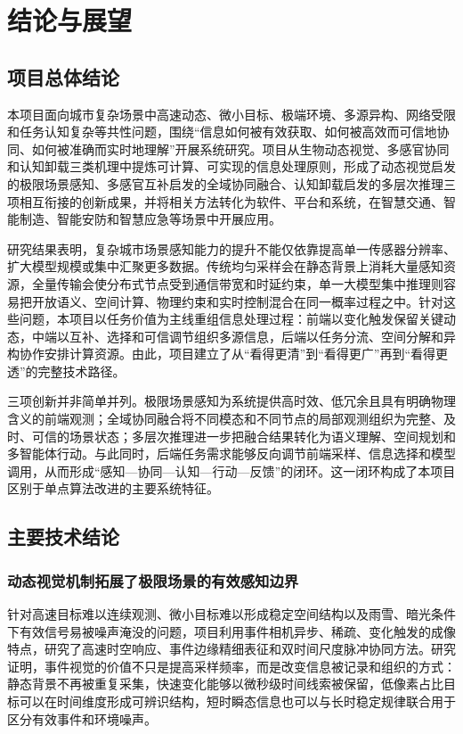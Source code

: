 \section{结论与展望}

\subsection{项目总体结论}

本项目面向城市复杂场景中高速动态、微小目标、极端环境、多源异构、网络受限和任务认知复杂等共性问题，围绕“信息如何被有效获取、如何被高效而可信地协同、如何被准确而实时地理解”开展系统研究。项目从生物动态视觉、多感官协同和认知卸载三类机理中提炼可计算、可实现的信息处理原则，形成了动态视觉启发的极限场景感知、多感官互补启发的全域协同融合、认知卸载启发的多层次推理三项相互衔接的创新成果，并将相关方法转化为软件、平台和系统，在智慧交通、智能制造、智能安防和智慧应急等场景中开展应用。

研究结果表明，复杂城市场景感知能力的提升不能仅依靠提高单一传感器分辨率、扩大模型规模或集中汇聚更多数据。传统均匀采样会在静态背景上消耗大量感知资源，全量传输会使分布式节点受到通信带宽和时延约束，单一大模型集中推理则容易把开放语义、空间计算、物理约束和实时控制混合在同一概率过程之中。针对这些问题，本项目以任务价值为主线重组信息处理过程：前端以变化触发保留关键动态，中端以互补、选择和可信调节组织多源信息，后端以任务分流、空间分解和异构协作安排计算资源。由此，项目建立了从“看得更清”到“看得更广”再到“看得更透”的完整技术路径。

三项创新并非简单并列。极限场景感知为系统提供高时效、低冗余且具有明确物理含义的前端观测；全域协同融合将不同模态和不同节点的局部观测组织为完整、及时、可信的场景状态；多层次推理进一步把融合结果转化为语义理解、空间规划和多智能体行动。与此同时，后端任务需求能够反向调节前端采样、信息选择和模型调用，从而形成“感知---协同---认知---行动---反馈”的闭环。这一闭环构成了本项目区别于单点算法改进的主要系统特征。

\subsection{主要技术结论}

\subsubsection{动态视觉机制拓展了极限场景的有效感知边界}

针对高速目标难以连续观测、微小目标难以形成稳定空间结构以及雨雪、暗光条件下有效信号易被噪声淹没的问题，项目利用事件相机异步、稀疏、变化触发的成像特点，研究了高速时空响应、事件边缘精细表征和双时间尺度脉冲协同方法。研究证明，事件视觉的价值不只是提高采样频率，而是改变信息被记录和组织的方式：静态背景不再被重复采集，快速变化能够以微秒级时间线索被保留，低像素占比目标可以在时间维度形成可辨识结构，短时瞬态信息也可以与长时稳定规律联合用于区分有效事件和环境噪声。

